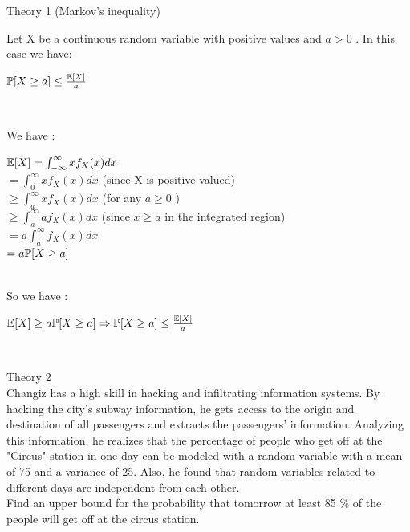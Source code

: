 \documentclass[30pt]{article}
\begin{document}
{\Large \color{blue} Theory 1 (Markov's inequality)} \\
{\color{blue} Let X be a continuous random variable with positive values and $a > 0$ . In this case we have:
\begin{center}
    
    $\Bbb{P}[X \ge a] \le \frac{\Bbb{E}[X]}{a} $
\end{center} \\
}
{\color{black} 
We have : \\
\begin{center}
    $\Bbb{E}[X] = \int_{-\infty}^{\infty}{xf_X(x)dx} $  \vspace{0.5cm}\\
    $= \int_{0}^{\infty}{xf_X(x)dx}$  \hspace{1cm}  (since X is positive valued) \vspace{0.25cm}\\
    $\ge \int_{a}^{\infty}{xf_X(x)dx} $ \hspace{1cm} (for any $a \ge 0$ ) \vspace{0.25cm}\\
    $\ge \int_{a}^{\infty}{af_X(x)dx} $ \hspace{1cm} (since $x \ge a$ in the integrated region) \vspace{0.5cm}\\
    $= a \int_{a}^{\infty}{f_X(x)dx}$ \vspace{0.25cm}\\
    $ = a\Bbb{P}[X \ge a] $
\end{center} \\
So we have : \\
\begin{center}
    $\Bbb{E}[X] \ge a\Bbb{P}[X \ge a] \Rightarrow \Bbb{P}[X \ge a] \le \frac{\Bbb{E}[X]}{a} $
\end{center} \\
}
{\Large \color{blue} Theory 2 } \\
{\color{blue} Changiz has a high skill in hacking and infiltrating information systems. By hacking the city's subway information, he gets access to the origin and destination of all passengers and extracts the passengers' information. Analyzing this information, he realizes that the percentage of people who get off at the "Circus" station in one day can be modeled with a random variable with a mean of 75 and a variance of 25. Also, he found that random variables related to different days are independent from each other. \\ } \newline
{\color{blue}{\large  1.} Find an upper bound for the probability that tomorrow at least 85 \% of the people will get off at the circus station.} \\
\end{document}
